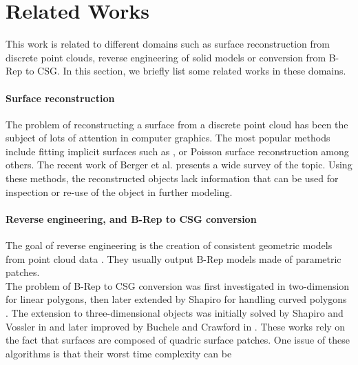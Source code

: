 \section{Related Works}
This work is related to different domains such as surface reconstruction from discrete point clouds, reverse engineering of solid models or conversion from B-Rep to CSG. 
In this section, we briefly list some related works in these domains. 

\paragraph{Surface reconstruction}
The problem of reconstructing a surface from a discrete point cloud has been the subject of lots of attention in computer graphics. 
The most popular methods include fitting implicit surfaces such as \cite{OBATS03}, or Poisson surface reconstruction \cite{KH13} among others. 
The recent work of Berger et al. \cite{berger2017survey} presents a wide survey of the topic.
Using these methods, the reconstructed objects lack information that can be used for inspection or re-use of the object in further modeling. 

\paragraph{Reverse engineering, and B-Rep to CSG conversion}
The goal of reverse engineering is the creation of consistent geometric models from point cloud data \cite{VMC97,BMV01}. They usually output B-Rep models 
made of parametric patches.
\\
The problem of B-Rep to CSG conversion was first investigated in 
two-dimension for linear polygons, then 
later extended by Shapiro for handling curved polygons \cite{shapiro1991efficient, shapiro2001convex}. 
The extension to three-dimensional objects was initially solved 
by Shapiro and Vossler in 
\cite{shapiro1991construction, shapiro1993separation} 
and later improved by 
Buchele and Crawford in \cite{buchele2004three}. 
These works rely on the fact that surfaces are composed of quadric surface patches. 
One issue of these algorithms is that their worst time complexity can be 

